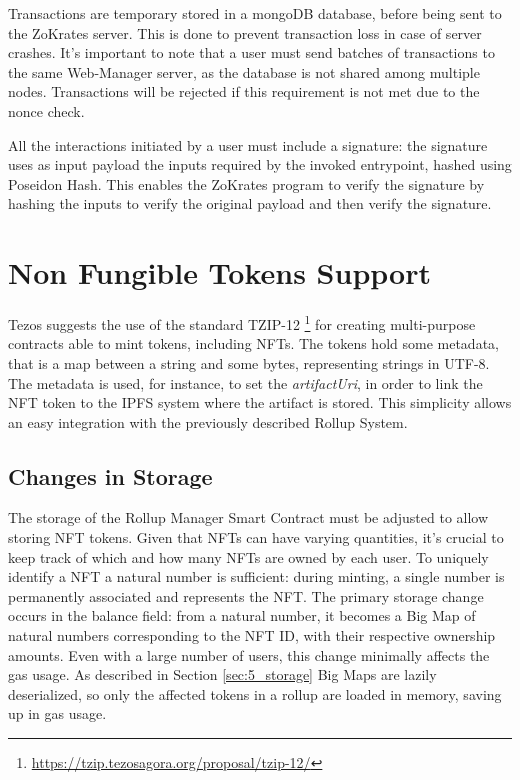 Transactions are temporary stored in a mongoDB database, before being sent to the ZoKrates server. This is done to prevent transaction loss in case of server crashes. It's important to note that a user must send batches of transactions to the same Web-Manager server, as the database is not shared among multiple nodes. Transactions will be rejected if this requirement is not met due to the nonce check.

All the interactions initiated by a user must include a signature: the signature uses as input payload the inputs required by the invoked entrypoint, hashed using Poseidon Hash. This enables the ZoKrates program to verify the signature by hashing the inputs to verify the original payload and then verify the signature.

\section{Non Fungible Tokens Support}

Tezos suggests the use of the standard TZIP-12 \footnote{\url{https://tzip.tezosagora.org/proposal/tzip-12/}} for creating multi-purpose contracts able to mint tokens, including NFTs. The tokens hold some metadata, that is a map between a string and some bytes, representing strings in UTF-8. The metadata is used, for instance, to set the \textit{artifactUri}, in order to link the NFT token to the IPFS system where the artifact is stored. This simplicity allows an easy integration with the previously described Rollup System.

\subsection{Changes in Storage}

The storage of the Rollup Manager Smart Contract must be adjusted to allow storing NFT tokens. Given that NFTs can have varying quantities, it's crucial to keep track of which and how many NFTs are owned by each user. To uniquely identify a NFT a natural number is sufficient: during minting, a single number is permanently associated and represents the NFT. The primary storage change occurs in the balance field: from a natural number, it becomes a Big Map of natural numbers corresponding to the NFT ID, with their respective ownership amounts. Even with a large number of users, this change minimally affects the gas usage. As described in Section \ref{sec:5_storage} Big Maps are lazily deserialized, so only the affected tokens in a rollup are loaded in memory, saving up in gas usage.

